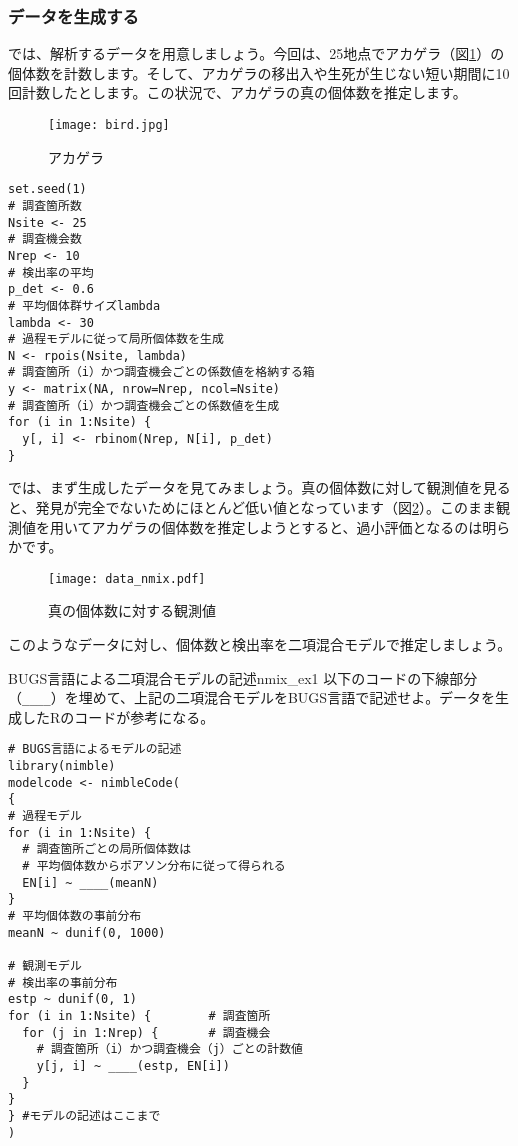 \subsubsection{データを生成する}
では、解析するデータを用意しましょう。今回は、25地点でアカゲラ（図\ref{bird}）の個体数を計数します。そして、アカゲラの移出入や生死が生じない短い期間に10回計数したとします。この状況で、アカゲラの真の個体数を推定します。
\begin{figure}[htb]
\begin{center}
\graphicspath{{4_hm/figs/}}
\texttt{[image: bird.jpg]}\\
\caption{アカゲラ}
\label{bird}
\end{center}
\end{figure}
\begin{verbatim}
set.seed(1)
# 調査箇所数
Nsite <- 25
# 調査機会数
Nrep <- 10
# 検出率の平均
p_det <- 0.6
# 平均個体群サイズlambda
lambda <- 30
# 過程モデルに従って局所個体数を生成
N <- rpois(Nsite, lambda)
# 調査箇所（i）かつ調査機会ごとの係数値を格納する箱
y <- matrix(NA, nrow=Nrep, ncol=Nsite)
# 調査箇所（i）かつ調査機会ごとの係数値を生成
for (i in 1:Nsite) {
  y[, i] <- rbinom(Nrep, N[i], p_det)
}
\end{verbatim}
では、まず生成したデータを見てみましょう。真の個体数に対して観測値を見ると、発見が完全でないためにほとんど低い値となっています（図\ref{data_nmix}）。このまま観測値を用いてアカゲラの個体数を推定しようとすると、過小評価となるのは明らかです。
\begin{figure}[htb]
\begin{center}
\graphicspath{{4_hm/figs/}}
\texttt{[image: data\_nmix.pdf]}\\
\caption{真の個体数に対する観測値}
\label{data_nmix}
\end{center}
\end{figure}

このようなデータに対し、個体数と検出率を二項混合モデルで推定しましょう。

\begin{exercise}{BUGS言語による二項混合モデルの記述}{nmix_ex1}
以下のコードの下線部分（\verb|____|）を埋めて、上記の二項混合モデルをBUGS言語で記述せよ。データを生成したRのコードが参考になる。
\begin{verbatim}
# BUGS言語によるモデルの記述
library(nimble)
modelcode <- nimbleCode(
{
# 過程モデル
for (i in 1:Nsite) {
  # 調査箇所ごとの局所個体数は
  # 平均個体数からポアソン分布に従って得られる
  EN[i] ~ ____(meanN)
}
# 平均個体数の事前分布
meanN ~ dunif(0, 1000)

# 観測モデル
# 検出率の事前分布
estp ~ dunif(0, 1)
for (i in 1:Nsite) {        # 調査箇所
  for (j in 1:Nrep) {       # 調査機会
    # 調査箇所（i）かつ調査機会（j）ごとの計数値
    y[j, i] ~ ____(estp, EN[i])
  }
}
} #モデルの記述はここまで
)
\end{verbatim}
\end{exercise}

